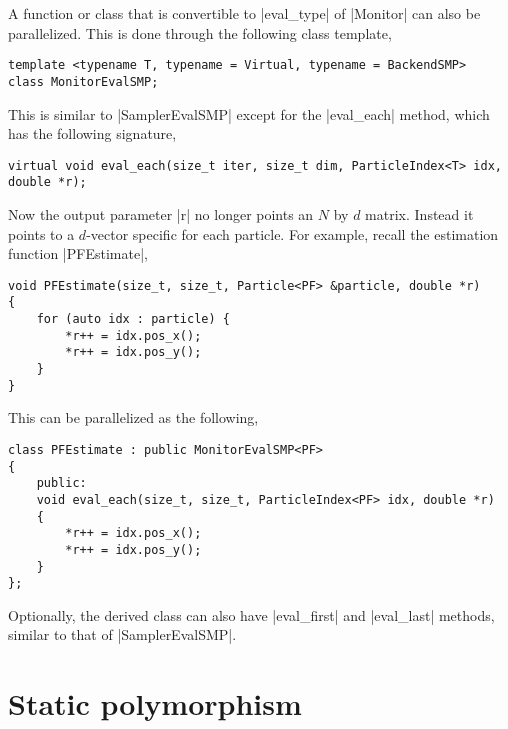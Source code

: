 A function or class that is convertible to |eval_type| of |Monitor| can also be
parallelized. This is done through the following class template,
\begin{verbatim}
template <typename T, typename = Virtual, typename = BackendSMP>
class MonitorEvalSMP;
\end{verbatim}
This is similar to |SamplerEvalSMP| except for the |eval_each| method, which
has the following signature,
\begin{verbatim}
virtual void eval_each(size_t iter, size_t dim, ParticleIndex<T> idx, double *r);
\end{verbatim}
Now the output parameter |r| no longer points an $N$ by $d$ matrix. Instead it
points to a $d$-vector specific for each particle. For example, recall the
estimation function |PFEstimate|,
\begin{verbatim}
void PFEstimate(size_t, size_t, Particle<PF> &particle, double *r)
{
    for (auto idx : particle) {
        *r++ = idx.pos_x();
        *r++ = idx.pos_y();
    }
}
\end{verbatim}
This can be parallelized as the following,
\begin{verbatim}
class PFEstimate : public MonitorEvalSMP<PF>
{
    public:
    void eval_each(size_t, size_t, ParticleIndex<PF> idx, double *r)
    {
        *r++ = idx.pos_x();
        *r++ = idx.pos_y();
    }
};
\end{verbatim}
Optionally, the derived class can also have |eval_first| and |eval_last|
methods, similar to that of |SamplerEvalSMP|.

\section{Static polymorphism}
\label{sec:Static polymorphism}

